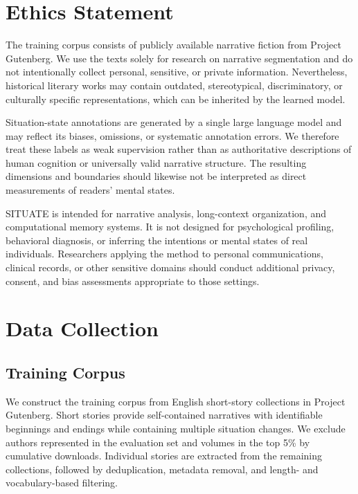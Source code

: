 \documentclass[11pt]{article}
\begin{document}
\section*{Ethics Statement}
The training corpus consists of publicly available narrative fiction from Project Gutenberg. We use the texts solely for research on narrative segmentation and do not intentionally collect personal, sensitive, or private information. Nevertheless, historical literary works may contain outdated, stereotypical, discriminatory, or culturally specific representations, which can be inherited by the learned model.

Situation-state annotations are generated by a single large language model and may reflect its biases, omissions, or systematic annotation errors. We therefore treat these labels as weak supervision rather than as authoritative descriptions of human cognition or universally valid narrative structure. The resulting dimensions and boundaries should likewise not be interpreted as direct measurements of readers’ mental states.

SITUATE is intended for narrative analysis, long-context organization, and computational memory systems. It is not designed for psychological profiling, behavioral diagnosis, or inferring the intentions or mental states of real individuals. Researchers applying the method to personal communications, clinical records, or other sensitive domains should conduct additional privacy, consent, and bias assessments appropriate to those settings.




\appendix

\newpage

\section{Data Collection}
\subsection{Training Corpus}
\label{app:training-corpus}

We construct the training corpus from English short-story collections in Project Gutenberg. Short stories provide self-contained narratives with identifiable beginnings and endings while containing multiple situation changes. We exclude authors represented in the evaluation set and volumes in the top 5\% by cumulative downloads. Individual stories are extracted from the remaining collections, followed by deduplication, metadata removal, and length- and vocabulary-based filtering.
\end{document}

